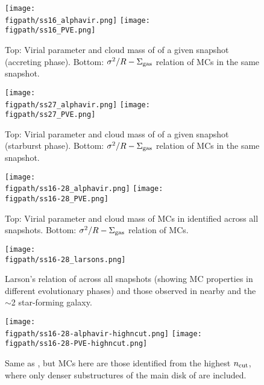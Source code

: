 \documentclass[iop]{emulateapj} %
\begin{document}
\begin{figure*}[htbp]
\centering
\texttt{[image: \\figpath/ss16\_alphavir.png]}
\texttt{[image: \\figpath/ss16\_PVE.png]}
\caption{
Top: Virial parameter and cloud mass of \flower of a given snapshot (accreting phase).
Bottom: $\sigma^2/R - \Sigma_{\rm gas}$ relation of MCs in the same snapshot.
\label{fig:alpha16}}
\end{figure*}


\begin{figure*}[htbp]
\centering
\texttt{[image: \\figpath/ss27\_alphavir.png]}
\texttt{[image: \\figpath/ss27\_PVE.png]}
\caption{
Top: Virial parameter and cloud mass of \flower of a given snapshot (starburst phase).
Bottom: $\sigma^2/R - \Sigma_{\rm gas}$ relation of MCs in the same snapshot.
\label{fig:alpha27}}
\end{figure*}






\begin{figure*}[htbp]
\centering
\texttt{[image: \\figpath/ss16-28\_alphavir.png]}
\texttt{[image: \\figpath/ss16-28\_PVE.png]}
\caption{
Top: Virial parameter and cloud mass of MCs in \flower identified across all snapshots.
Bottom: $\sigma^2/R - \Sigma_{\rm gas}$ relation of MCs.
\label{fig:alpha16-28}}
\end{figure*}

\begin{figure*}[htbp]
\centering
\texttt{[image: \\figpath/ss16-28\_larsons.png]}
\caption{
Larson's relation of \flower across all snapshots (showing MC properties in different evolutionary
phases) and
those observed in nearby and the \z$\sim$2 star-forming galaxy.
\label{fig:larsons16-28}}
\end{figure*}


\begin{figure*}[htbp]
\centering
\texttt{[image: \\figpath/ss16-28-alphavir-highncut.png]}
\texttt{[image: \\figpath/ss16-28-PVE-highncut.png]}
\caption{
Same as , but MCs here are those identified from the highest $n_{\rm cut}$,
where only denser substructures of the main disk of \flower are included.
\label{fig:alpha16-28-highncut}}
\end{figure*}
\end{document}

